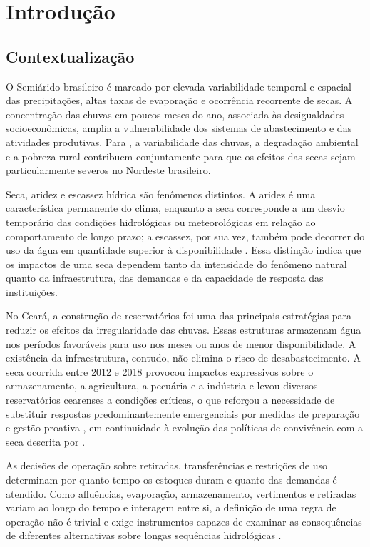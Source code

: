 \chapter{Introdução}
\label{cap:introducao}

\section{Contextualização}
\label{sec:contextualizacao}

O Semiárido brasileiro é marcado por elevada variabilidade temporal e espacial das precipitações, altas taxas de evaporação e ocorrência recorrente de secas. A concentração das chuvas em poucos meses do ano, associada às desigualdades socioeconômicas, amplia a vulnerabilidade dos sistemas de abastecimento e das atividades produtivas. Para , a variabilidade das chuvas, a degradação ambiental e a pobreza rural contribuem conjuntamente para que os efeitos das secas sejam particularmente severos no Nordeste brasileiro.

Seca, aridez e escassez hídrica são fenômenos distintos. A aridez é uma característica permanente do clima, enquanto a seca corresponde a um desvio temporário das condições hidrológicas ou meteorológicas em relação ao comportamento de longo prazo; a escassez, por sua vez, também pode decorrer do uso da água em quantidade superior à disponibilidade \cite{deNys2016}. Essa distinção indica que os impactos de uma seca dependem tanto da intensidade do fenômeno natural quanto da infraestrutura, das demandas e da capacidade de resposta das instituições.

No Ceará, a construção de reservatórios foi uma das principais estratégias para reduzir os efeitos da irregularidade das chuvas. Essas estruturas armazenam água nos períodos favoráveis para uso nos meses ou anos de menor disponibilidade. A existência da infraestrutura, contudo, não elimina o risco de desabastecimento. A seca ocorrida entre 2012 e 2018 provocou impactos expressivos sobre o armazenamento, a agricultura, a pecuária e a indústria e levou diversos reservatórios cearenses a condições críticas, o que reforçou a necessidade de substituir respostas predominantemente emergenciais por medidas de preparação e gestão proativa \cite{pontesFilho2020}, em continuidade à evolução das políticas de convivência com a seca descrita por .

As decisões de operação sobre retiradas, transferências e restrições de uso determinam por quanto tempo os estoques duram e quanto das demandas é atendido. Como afluências, evaporação, armazenamento, vertimentos e retiradas variam ao longo do tempo e interagem entre si, a definição de uma regra de operação não é trivial e exige instrumentos capazes de examinar as consequências de diferentes alternativas sobre longas sequências hidrológicas \cite{labadie2004,yeh1985}.

